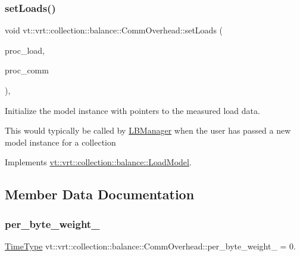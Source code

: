 \subsubsection{\texorpdfstring{set\+Loads()}{setLoads()}}
{\footnotesize\ttfamily void vt\+::vrt\+::collection\+::balance\+::\+Comm\+Overhead\+::set\+Loads (\begin{DoxyParamCaption}\item[{std\+::unordered\+\_\+map$<$ \hyperlink{namespacevt_a46ce6733d5cdbd735d561b7b4029f6d7}{Phase\+Type}, \hyperlink{namespacevt_1_1vrt_1_1collection_1_1balance_a5339303db2e1ce964d783a53fd74e6b1}{Load\+Map\+Type} $>$ const $\ast$}]{proc\+\_\+load,  }\item[{std\+::unordered\+\_\+map$<$ \hyperlink{namespacevt_a46ce6733d5cdbd735d561b7b4029f6d7}{Phase\+Type}, \hyperlink{namespacevt_1_1vrt_1_1collection_1_1balance_a01ee1fb0ae2da1d2ab7fdca3be9ae351}{Comm\+Map\+Type} $>$ const $\ast$}]{proc\+\_\+comm }\end{DoxyParamCaption})\hspace{0.3cm}{\ttfamily [override]}, {\ttfamily [virtual]}}



Initialize the model instance with pointers to the measured load data. 

This would typically be called by \hyperlink{structvt_1_1vrt_1_1collection_1_1balance_1_1_l_b_manager}{L\+B\+Manager} when the user has passed a new model instance for a collection 

Implements \hyperlink{structvt_1_1vrt_1_1collection_1_1balance_1_1_load_model_a07512b8d95025a21a7c25cc3fdb817ad}{vt\+::vrt\+::collection\+::balance\+::\+Load\+Model}.



\subsection{Member Data Documentation}
\mbox{\label{structvt_1_1vrt_1_1collection_1_1balance_1_1_comm_overhead_a35c4dcc20558f0f5092f9d5ab2e1a662}} 
\subsubsection{\texorpdfstring{per\+\_\+byte\+\_\+weight\+\_\+}{per\_byte\_weight\_}}
{\footnotesize\ttfamily \hyperlink{namespacevt_a876a9d0cd5a952859c72de8a46881442}{Time\+Type} vt\+::vrt\+::collection\+::balance\+::\+Comm\+Overhead\+::per\+\_\+byte\+\_\+weight\+\_\+ = 0.\hspace{0.3cm}{\ttfamily [private]}}

